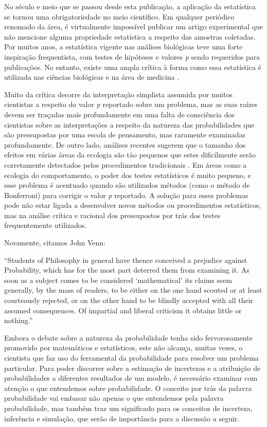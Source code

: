 \documentclass[12pt,a4paper]{article}
\begin{document}
No século e meio que se passou desde esta publicação, a aplicação da estatística se tornou uma obrigatoriedade no meio científico.
Em qualquer periódico renomado da área, é virtualmente impossível publicar um artigo experimental que não 
mencione alguma propriedade
estatística a respeito das amostras coletadas. Por muitos anos, a estatística vigente nas análises biológicas teve uma
forte inspiração frequentista, com testes de hipóteses e valores {\em p} sendo requeridos para publicações. 
No entanto, existe uma ampla crítica à forma como essa estatística é
utilizada nas ciências biológicas e na área de medicina \cite{Ioannidis05}.

Muito da crítica decorre da interpretação
simplista assumida por muitos cientistas a respeito do valor {\em p} reportado sobre um problema, mas as suas raízes devem
ser traçadas mais profundamente em uma falta de consciência dos cientistas sobre as interpretações a respeito da natureza
das probabilidades que são pressupostas por uma escola de pensamento, mas raramente examinadas profundamente. 
De outro lado, análises recentes sugerem que o tamanho dos efeitos em várias áreas da ecologia são tão pequenos que estes
dificilmente serão corretamente detectados pelos procedimentos tradicionais \cite{Jennions03}. Em áreas como a ecologia do
comportamento, o poder dos testes estatísticos é muito pequeno, e esse problema é acentuado quando são utilizados métodos
(como o método de Bonferroni) para corrigir o valor {\em p} reportado. A solução para esses problemas pode não estar ligada
a desenvolver novos métodos ou procedimentos estatísticos, mas na análise crítica e racional dos pressupostos por trás
dos testes frequentemente utilizados.

Novamente, citamos John Venn:

``Students of Philosophy in general have thence conceived a prejudice against Probability, which has for the most part
deterred them from examining it. As soon as a subject comes to be considered `mathematical' its claims seem generally,
by the mass of readers, to be either on the one hand scouted or at least courteously rejected, or on the other hand
to be blindly accepted with all their assumed consequences. Of impartial and liberal criticism it obtains little or nothing.''
\cite{Venn1866}

Embora o debate sobre a natureza da probabilidade tenha sido fervorosamente promovido por matemáticos e estatísticos,
este não alcança, muitas vezes, o cientista que faz uso do ferramental da probabilidade para resolver um problema particular.
Para poder discorrer sobre a estimação de incertezas e a atribuição de probabilidades a diferentes resultados de um modelo,
é necessário examinar com atenção o que entendemos sobre probabilidade. O conceito por trás da palavra probabilidade vai
embasar não apenas o que entendemos pela palavra probabilidade, mas também traz um significado para os conceitos de
incerteza, inferência e simulação, que serão de importância para a discussão a seguir. 
\end{document}
